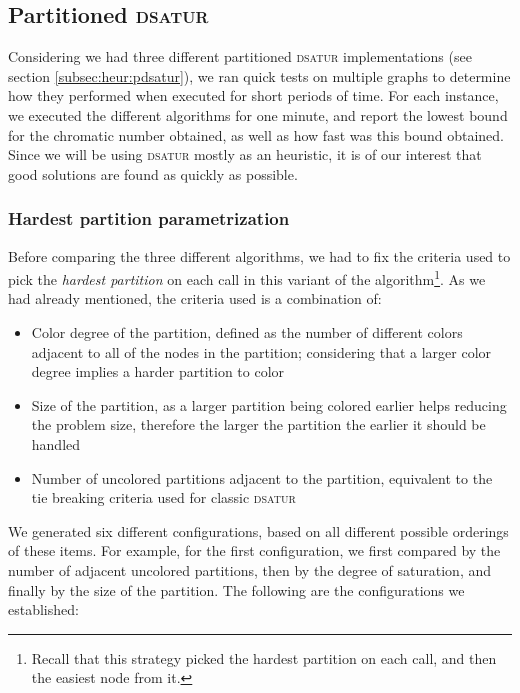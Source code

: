
\subsection{Partitioned \textsc{dsatur}}
\label{subsec:resultspdsatur}

Considering we had three different partitioned \textsc{dsatur} implementations (see section \ref{subsec:heur:pdsatur}), we ran quick tests on multiple graphs to determine how they performed when executed for short periods of time. For each instance, we executed the different algorithms for one minute, and report the lowest bound for the chromatic number obtained, as well as how fast was this bound obtained. Since we will be using \textsc{dsatur} mostly as an heuristic, it is of our interest that good solutions are found as quickly as possible.

\subsubsection{Hardest partition parametrization}

Before comparing the three different algorithms, we had to fix the criteria used to pick the \textit{hardest partition} on each call in this variant of the algorithm\footnote{Recall that this strategy picked the hardest partition on each call, and then the easiest node from it.}. As we had already mentioned, the criteria used is a combination of:

\begin{itemize}
	\item{Color degree of the partition, defined as the number of different colors adjacent to all of the nodes in the partition; considering that a larger color degree implies a harder partition to color}
	\item{Size of the partition, as a larger partition being colored earlier helps reducing the problem size, therefore the larger the partition the earlier it should be handled}
	\item{Number of uncolored partitions adjacent to the partition, equivalent to the tie breaking criteria used for classic \textsc{dsatur}} 
\end{itemize}

We generated six different configurations, based on all different possible orderings of these items. For example, for the first configuration, we first compared by the number of adjacent uncolored partitions, then by the degree of saturation, and finally by the size of the partition. The following are the configurations we established:

